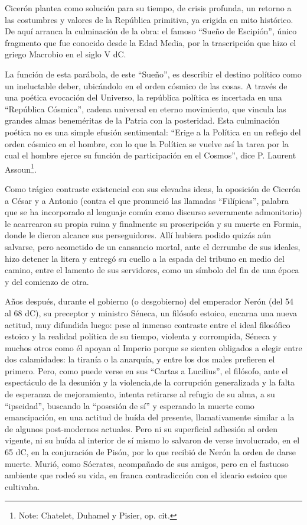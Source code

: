 \documentclass[
]{book}
\begin{document}
Cicerón plantea como solución para su tiempo, de crisis profunda, un retorno a las costumbres y valores de la República primitiva, ya erigida en mito histórico. De aquí arranca la culminación de la obra: el famoso ``Sueño de Escipión'', único fragmento que fue conocido desde la Edad Media, por la trascripción que hizo el griego Macrobio en el siglo V dC.

La función de esta parábola, de este ``Sueño'', es describir el destino político como un ineluctable deber, ubicándolo en el orden cósmico de las cosas. A través de una poética evocación del Universo, la república política es incertada en una ``República Cósmica'', cadena universal en eterno movimiento, que vincula las grandes almas beneméritas de la Patria con la posteridad. Esta culminación poética no es una simple efusión sentimental: ``Erige a la Política en un reflejo del orden cósmico en el hombre, con lo que la Política se vuelve así la tarea por la cual el hombre ejerce su función de participación en el Cosmos'', dice P. Laurent Assoun\footnote{Note: Chatelet, Duhamel y Pisier, op. cit.}.

Como trágico contraste existencial con sus elevadas ideas, la oposición de Cicerón a César y a Antonio (contra el que pronunció las llamadas ``Filípicas'', palabra que se ha incorporado al lenguaje común como discurso severamente admonitorio) le acarrearon su propia ruina y finalmente su proscripción y su muerte en Formia, donde le dieron alcance sus perseguidores. Allí hubiera podido quizás aún salvarse, pero acometido de un cansancio mortal, ante el derrumbe de sus ideales, hizo detener la litera y entregó su cuello a la espada del tribuno en medio del camino, entre el lamento de sus servidores, como un símbolo del fin de una época y del comienzo de otra.

Años después, durante el gobierno (o desgobierno) del emperador Nerón (del 54 al 68 dC), su preceptor y ministro Séneca, un filósofo estoico, encarna una nueva actitud, muy difundida luego: pese al inmenso contraste entre el ideal filosófico estoico y la realidad política de su tiempo, violenta y corrompida, Séneca y muchos otros como él apoyan al Imperio porque se sienten obligados a elegir entre dos calamidades: la tiranía o la anarquía, y entre los dos males prefieren el primero. Pero, como puede verse en sus ``Cartas a Lucilius'', el filósofo, ante el espectáculo de la desunión y la violencia,de la corrupción generalizada y la falta de esperanza de mejoramiento, intenta retirarse al refugio de su alma, a su ``ipseidad'', buscando la ``posesión de sí'' y esperando la muerte como emancipación, en una actitud de huída del presente, llamativamente similar a la de algunos post-modernos actuales. Pero ni su superficial adhesión al orden vigente, ni su huída al interior de sí mismo lo salvaron de verse involucrado, en el 65 dC, en la conjuración de Pisón, por lo que recibió de Nerón la orden de darse muerte. Murió, como Sócrates, acompañado de sus amigos, pero en el fastuoso ambiente que rodeó su vida, en franca contradicción con el ideario estoico que cultivaba.
\end{document}
